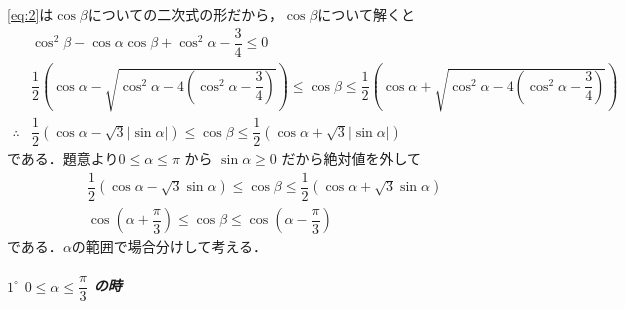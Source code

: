 \documentclass[../../main.tex]{subfiles}
\begin{document}
\cref{eq:2}は$\cos\beta$についての二次式の形だから，$\cos\beta$について解くと
\begin{align}
  & \cos^2\beta - \cos\alpha\cos\beta+\cos^2\alpha-\dfrac{3}{4} \le 0 \\
  & \dfrac{1}{2}\left(\cos\alpha - \sqrt{\cos^2\alpha-4(\cos^2\alpha-\dfrac{3}{4})}\right)
  \le \cos\beta
  \le \dfrac{1}{2}\left(\cos\alpha + \sqrt{\cos^2\alpha-4(\cos^2\alpha-\dfrac{3}{4})}\right) \\
  \therefore
  & \dfrac{1}{2}\left(\cos\alpha - \sqrt{3}|\sin\alpha|\right)
  \le \cos\beta
  \le \dfrac{1}{2}\left(\cos\alpha + \sqrt{3}|\sin\alpha|\right)
\end{align}
である．題意より$0 \le \alpha \le \pi$ から $\sin\alpha \ge 0$ だから絶対値を外して
\begin{align}
  &\dfrac{1}{2}(\cos\alpha - \sqrt{3}\sin\alpha) \le \cos\beta \le \dfrac{1}{2}(\cos\alpha + \sqrt{3}\sin\alpha) \\
  &\cos\left(\alpha + \dfrac{\pi}{3}\right) \le \cos\beta \le \cos\left(\alpha - \dfrac{\pi}{3}\right)\label{eq:3}
\end{align}
である．$\alpha$の範囲で場合分けして考える．

\subparagraph{$1^\circ$ $0 \le \alpha \le \dfrac{\pi}{3}$ の時}
\end{document}
